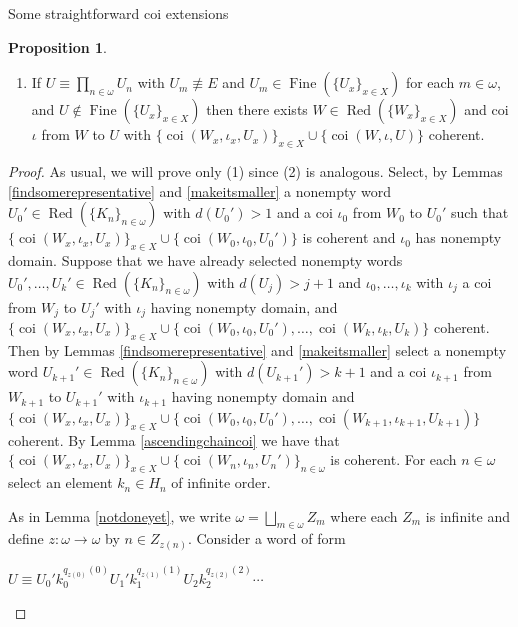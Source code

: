 \documentclass{amsart}
\theoremstyle{definition}\newtheorem{theorem}{Theorem}
\theoremstyle{definition}\newtheorem*{A}{Main Theorem}
\theoremstyle{definition}\newtheorem*{B}{Theorem \ref{elementaryequiv}}
\theoremstyle{definition}\newtheorem*{C}{Theorem \ref{continuous}}
\theoremstyle{definition}\newtheorem*{D}{Theorem \ref{bigisomorphism2}}
\theoremstyle{definition}\newtheorem{bigtheorem}{Main Theorem}
\numberwithin{theorem}{section}
\theoremstyle{definition}\newtheorem{corollary}[theorem]{Corollary}
\theoremstyle{definition}\newtheorem{proposition}[theorem]{Proposition}
\theoremstyle{definition}\newtheorem{definition}[theorem]{Definition}
\theoremstyle{definition}\newtheorem{question}[theorem]{Question}
\theoremstyle{definition}\newtheorem{example}[theorem]{Example}
\theoremstyle{definition}\newtheorem{remark}[theorem]{Remark}
\theoremstyle{definition}\newtheorem{note}[theorem]{Note}
\theoremstyle{definition}\newtheorem{lemma}[theorem]{Lemma}
\theoremstyle{definition}\newtheorem{fact}[theorem]{Fact}
\theoremstyle{definition}\newtheorem{define}[theorem]{Definition}
\theoremstyle{definition}\newtheorem{claim}[theorem]{Claim}
\theoremstyle{definition}\newtheorem{obs}[theorem]{Observation}
\theoremstyle{definition}\newtheorem{definitions}[theorem]{Definitions}
\newcommand{\Red}{\operatorname{Red}}
\newcommand{\Fine}{\operatorname{Fine}}
\newcommand{\coi}{\operatorname{coi}}
\begin{document}
\begin{section}{Some straightforward coi extensions}
\begin{proposition}
\begin{enumerate}
\item If $U \equiv \prod_{n \in \omega} U_n$ with $U_m \not\equiv E$ and $U_m \in \Fine(\{U_x\}_{x \in X})$ for each $m \in \omega$, and $U \notin \Fine(\{U_x\}_{x \in X})$ then there exists $W \in \Red(\{W_x\}_{x \in X})$ and coi $\iota$ from $W$ to $U$ with $\{\coi(W_x, \iota_x, U_x)\}_{x \in X} \cup \{\coi(W, \iota, U)\}$ coherent.

\end{enumerate}

\end{proposition}

\begin{proof}  As usual, we will prove only (1) since (2) is analogous.  Select, by Lemmas \ref{findsomerepresentative} and \ref{makeitsmaller} a nonempty word $U_0' \in \Red(\{K_n\}_{n \in \omega})$ with $d(U_0') > 1$ and a coi $\iota_0$ from $W_0$ to $U_0'$ such that $\{\coi(W_x, \iota_x, U_x)\}_{x \in X} \cup \{\coi(W_0, \iota_0, U_0')\}$ is coherent and $\iota_0$ has nonempty domain.  Suppose that we have already selected nonempty words $U_0', \ldots, U_k' \in \Red(\{K_n\}_{n \in \omega})$ with $d(U_j) > j + 1$ and $\iota_0, \ldots, \iota_k$ with $\iota_j$ a coi from $W_j$ to $U_j'$ with $\iota_j$ having nonempty domain, and $\{\coi(W_x, \iota_x, U_x)\}_{x \in X} \cup \{\coi(W_0, \iota_0, U_0'), \ldots, \coi(W_k, \iota_k, U_k)\}$ coherent.  Then by Lemmas \ref{findsomerepresentative} and \ref{makeitsmaller} select a nonempty word $U_{k+1}' \in \Red(\{K_n\}_{n \in \omega})$ with $d(U_{k+1}') >  k + 1$ and a coi $\iota_{k+1}$ from $W_{k+1}$ to $U_{k+1}'$ with $\iota_{k+1}$ having nonempty domain and $\{\coi(W_x, \iota_x, U_x)\}_{x \in X} \cup \{\coi(W_0, \iota_0, U_0'), \ldots, \coi(W_{k+1}, \iota_{k+1}, U_{k+1})\}$ coherent.  By Lemma \ref{ascendingchaincoi} we have that $\{\coi(W_x, \iota_x, U_x)\}_{x \in X} \cup \{\coi(W_n, \iota_n, U_n')\}_{n \in \omega}$ is coherent.  For each $n \in \omega$ select an element $k_n \in H_n$ of infinite order.  


As in Lemma \ref{notdoneyet}, we write $\omega = \bigsqcup_{m \in \omega} Z_m$ where each $Z_m$ is infinite and define $z: \omega \rightarrow \omega$ by $n \in Z_{z(n)}$.  Consider a word of form

\begin{center}

$U \equiv U_0'k_0^{q_{z(0)}(0)} U_1'k_1^{q_{z(1)}(1)}U_2k_2^{q_{z(2)}(2)} \cdots$

\end{center}


\end{proof}
\end{section}
\end{document}
